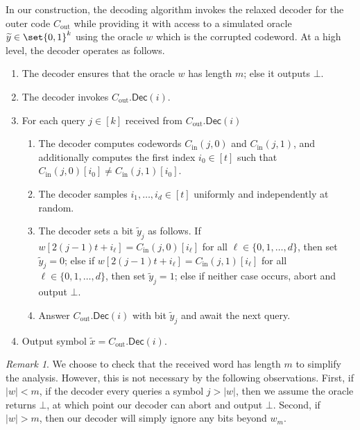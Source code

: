 \documentclass[10pt,a4paper]{article}
\theoremstyle{remark}
\newtheorem{remark}{Remark}
\newcommand{\Dec}{\ensuremath{\mathsf{Dec}}\xspace}
\newcommand{\authnote}[3]{\textcolor{#2}{{\sf (#1's Note: {\sl{#3}})}}}
\newcommand{\jeremiah}{\authnote{Jeremiah}{blue}}
\newcommand{\authnote}{}
\newcommand{\jeremiah}[1]{}
\newcommand{\tildex}{\ensuremath{\widetilde{x}}\xspace}
\newcommand{\tildey}{\ensuremath{\widetilde{y}}\xspace}
\newcommand{\Cout}{C_{\text{out}}}
\newcommand{\Cin}{C_{\text{in}}}
\begin{document}
In our construction, the decoding algorithm invokes the relaxed decoder for the outer code $\Cout$ while providing it with access to a simulated oracle $\widetilde{y} \in \set{0,1}^k$ using the oracle $w$ which is the corrupted codeword.
At a high level, the decoder operates as follows.
\begin{enumerate}
	\item The decoder ensures that the oracle $w$ has length $m$; else it outputs $\bot$.
	
	\item The decoder invokes $\Cout.\Dec(i)$.
	
	\item For each query $j \in [k]$ received from $\Cout.\Dec(i)$
	\begin{enumerate}
		\item The decoder computes codewords $\Cin(j, 0)$ and $\Cin(j,1)$, and additionally computes the first index $i_0 \in [t]$ such that $\Cin(j,0)[i_0] \neq \Cin(j,1)[i_0]$.
		
		\item The decoder samples $i_1,\dotsc, i_d \in [t]$ uniformly and independently at random.
		
		\item The decoder sets a bit $\tildey_j$ as follows. 
		If $w[ 2(j-1)t + i_\ell ] = \Cin(j,0)[i_\ell]$ for all $\ell \in \{0,1,\dotsc, d\}$, then set $\tildey_j = 0$; else if $w[ 2(j-1)t+ i_\ell ] = \Cin(j,1)[i_\ell]$ for all $\ell \in \{0,1,\dotsc, d\}$, then set $\tildey_j = 1$; else if neither case occurs, abort and output $\bot$.
		
		\item Answer $\Cout.\Dec(i)$ with bit $\tildey_j$ and await the next query.
	\end{enumerate}
	
	\item Output symbol $\tildex = \Cout.\Dec(i)$.
\end{enumerate}
\begin{remark}
    We choose to check that the received word has length $m$ to simplify the analysis.
    However, this is not necessary by the following observations.
    First, if $|w| < m$, if the decoder every queries a symbol $j > |w|$, then we assume the oracle returns $\bot$, at which point our decoder can abort and output $\bot$.
    Second, if $|w| > m$, then our decoder will simply ignore any bits beyond $w_m$.
\end{remark}
\end{document}

